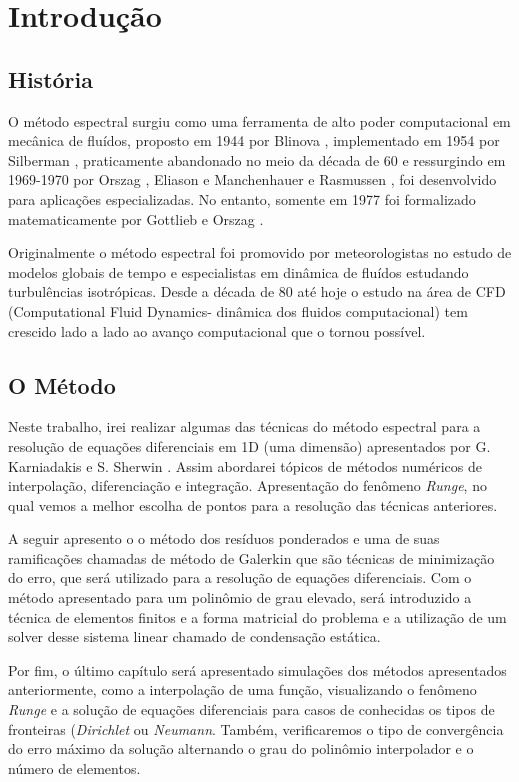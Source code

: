 \chapter{Introdução}
\label{cap:introducao}
\section{História}
O método espectral surgiu como uma ferramenta de alto poder computacional em mecânica de fluídos, proposto em 1944 por Blinova \cite{blinova1944}, implementado em 1954 por Silberman \cite{silberman}, praticamente abandonado no meio da década de 60 e ressurgindo em 1969-1970 por Orszag \cite{Orszag70}, Eliason e Manchenhauer  e Rasmussen \cite{eliasenauermussen}, foi desenvolvido para aplicações especializadas. No entanto,  somente em 1977 foi formalizado matematicamente por Gottlieb e Orszag \cite{Orslieb77}.

Originalmente o método espectral foi promovido por meteorologistas no estudo de modelos globais de tempo e especialistas em dinâmica de fluídos estudando turbulências isotrópicas. Desde a década de 80 até hoje o  estudo na área de CFD (Computational Fluid Dynamics- dinâmica dos fluidos computacional) tem crescido lado a lado ao avanço computacional que o tornou possível.
\section{O Método}
 Neste trabalho, irei realizar algumas das técnicas do método espectral para a resolução de equações diferenciais em 1D (uma dimensão) apresentados por G. Karniadakis e S. Sherwin \citep{book:karniadakis}. Assim abordarei tópicos de métodos numéricos  de interpolação, diferenciação e integração. Apresentação do fenômeno \emph{Runge}, no qual vemos a melhor escolha de pontos para a resolução das técnicas anteriores.
 
 A seguir apresento o o método dos resíduos ponderados e uma de suas ramificações chamadas de  método de Galerkin que são técnicas de minimização do erro, que será utilizado para a resolução de equações diferenciais. Com o método apresentado para um polinômio de grau elevado, será introduzido a técnica de elementos finitos e a forma matricial do problema e a utilização de um solver desse sistema linear chamado de condensação estática.
 
 Por fim, o último capítulo será apresentado simulações dos métodos apresentados anteriormente, como a interpolação de uma função, visualizando o fenômeno \emph{Runge} e a solução de equações diferenciais para casos de conhecidas os tipos de fronteiras (\emph{Dirichlet} ou \emph{Neumann}. Também, verificaremos o tipo de convergência do erro máximo da solução alternando o grau do polinômio interpolador e o número de elementos.
  
